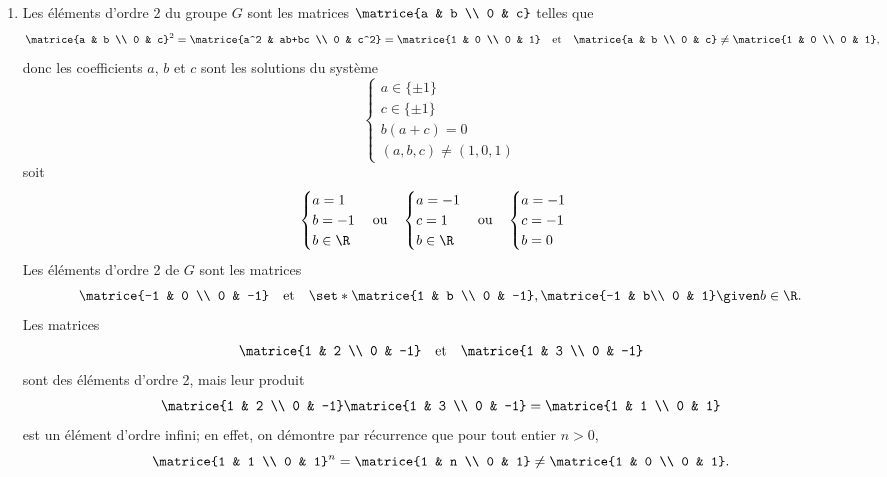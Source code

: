 \begin{enumerate}
    \item 
      Les éléments d'ordre $2$ du groupe $G$ sont les matrices
      $\matrice{a & b \\ 0 & c}$ telles que
      \[
        \matrice{a & b \\ 0 & c}^2 
        = \matrice{a^2 & ab+bc \\ 0 & c^2} 
        = \matrice{1 & 0 \\ 0 & 1}
        \quad\text{et}\quad
        \matrice{a & b \\ 0 & c}\neq\matrice{1 & 0 \\ 0 & 1},
      \]
    donc les coefficients $a$, $b$ et $c$ sont les solutions du système
    \[
        \begin{cases}
          a \in\{\pm 1\}\\
          c \in\{\pm 1\}\\
          b(a+c) = 0\\
          (a,b,c) \neq (1,0,1)
        \end{cases}
    \]
    soit
    \[
      \begin{cases}
        a = 1\\
        b = -1\\
        b \in \R
      \end{cases}
      \text{ou}\quad
      \begin{cases}
        a = -1\\
        c = 1\\
        b \in \R
      \end{cases}
      \text{ou}\quad
      \begin{cases}
        a = -1\\
        c = -1\\
        b = 0
      \end{cases}
    \]
    Les éléments d'ordre 2 de $G$ sont les matrices
    \[
      \matrice{-1 & 0 \\ 0 & -1}
      \quad\text{et}\quad
      \set*{\matrice{1 & b \\ 0 & -1}, \matrice{-1 & b\\ 0 & 1} \given b\in\R}.
    \]
    Les matrices 
    \[
      \matrice{1 & 2 \\ 0 & -1}
      \quad\text{et}\quad 
      \matrice{1 & 3 \\ 0 & -1}
    \]
    sont des éléments d'ordre 2, mais leur produit
    \[
      \matrice{1 & 2 \\ 0 & -1} \matrice{1 & 3 \\ 0 & -1} 
      = \matrice{1 & 1 \\ 0 & 1}
    \]
    est un élément d'ordre infini; en effet, on démontre par récurrence que
    pour tout entier $n>0$,
    \[
      \matrice{1 & 1 \\ 0 & 1}^n = 
        \matrice{1 & n \\ 0 & 1} \neq \matrice{1 & 0 \\ 0 & 1}.
    \]
\end{enumerate}


